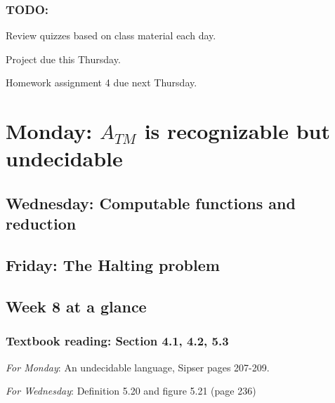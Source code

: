 \begin{comment}
\end{comment}

\subsubsection*{TODO:}
\begin{list}
   {\itemsep2pt}
   \item Review quizzes based on class material each day.
   \item Project due this Thursday.
   \item Homework assignment 4 due next Thursday.
\end{list}


\newpage

\section*{Monday: $A_{TM}$ is recognizable but undecidable}


    
\newpage
\subsection*{Wednesday: Computable functions and reduction}




\newpage
\subsection*{Friday: The Halting problem}



\newpage

\subsection*{Week 8 at a glance}

\subsubsection*{Textbook reading: Section 4.1, 4.2, 5.3}

{\it For Monday}: An undecidable language, Sipser pages 207-209.

{\it For Wednesday}: Definition 5.20 and figure 5.21 (page 236)

